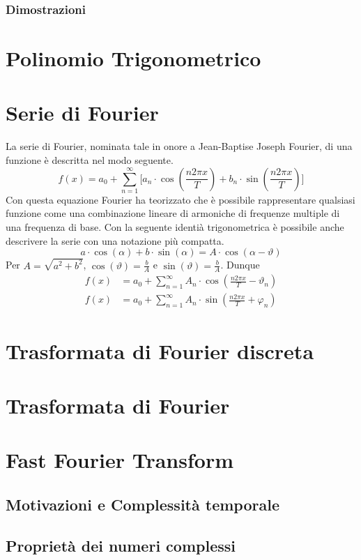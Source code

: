 \subsubsection{Dimostrazioni}


\section{Polinomio Trigonometrico}


\section{Serie di Fourier}
La serie di Fourier, nominata tale in onore a Jean-Baptise Joseph Fourier, di
una funzione \`e descritta nel modo seguente.
\begin{equation} \label{eq:fourier-series}
    f(x) = a_0 + \sum_{n=1}^{\infty}\Big [
        a_n\cdot\cos(\frac{n2\pi x}{T}) +
        b_n\cdot\sin(\frac{n2\pi x}{T}) \Big ]
\end{equation}
Con questa equazione Fourier ha teorizzato che \`e possibile rappresentare
qualsiasi funzione come una combinazione lineare di armoniche di frequenze
multiple di una frequenza di base. Con la seguente identi\`a trigonometrica
\`e possibile anche descrivere la serie con una notazione pi\`u compatta.
\begin{equation*}
    a\cdot\cos(\alpha) + b\cdot\sin(\alpha) = A\cdot\cos(\alpha-\vartheta)
\end{equation*}
Per \(A = \sqrt{a^2+b^2}\), \(\cos(\vartheta)=\frac{b}{A}\) e
\(\sin(\vartheta)=\frac{b}{A}\). Dunque
\begin{align}
    f(x) &= a_0 + \sum_{n=1}^{\infty} 
        A_n\cdot\cos(\frac{n2\pi x}{T} - \vartheta_n) \\
    f(x) &= a_0 + \sum_{n=1}^{\infty} 
        A_n\cdot\sin(\frac{n2\pi x}{T} + \varphi_n)
\end{align}

\section{Trasformata di Fourier discreta}

\section{Trasformata di Fourier}

\section{Fast Fourier Transform}
\subsection{Motivazioni e Complessit\`a temporale}
\subsection{Propriet\`a dei numeri complessi}


